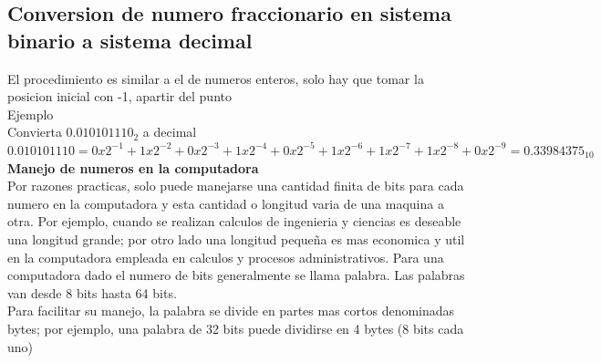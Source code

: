 \documentclass{article}
\begin{document}
\begin{multicols}{2}
\section{Conversion de numero fraccionario en sistema binario a sistema decimal}
\label{sec:Con}
El procedimiento es similar a el de numeros enteros, solo hay que tomar la posicion inicial con -1, apartir del punto 
\\
Ejemplo
\\
Convierta $0.010101110_{2}$ a decimal 
\\

$0.010101110=0x2^{-1}+1x2^{-2}+0x2^{-3}+1x2^{-4}+0x2^{-5}+1x2^{-6}+1x2^{-7}+1x2^{-8}+0x2^{-9}=0.33984375_{10}$
\\
\textbf{Manejo de numeros en la computadora}
\\
Por razones practicas, solo puede manejarse una cantidad finita de bits para cada numero en la computadora y esta cantidad o longitud varia de una maquina a otra. Por ejemplo, cuando se realizan calculos de ingenieria y ciencias es deseable una longitud grande; por otro lado una longitud pequeña es mas economica y util en la computadora empleada en calculos y procesos administrativos. Para una computadora dado el numero de bits generalmente se llama palabra. Las palabras van desde 8 bits hasta 64 bits.
\\
Para facilitar su manejo, la palabra se divide en partes mas cortos denominadas bytes; por ejemplo, una palabra de 32 bits puede dividirse en 4 bytes (8 bits cada uno)

\end{multicols}
\end{document}
